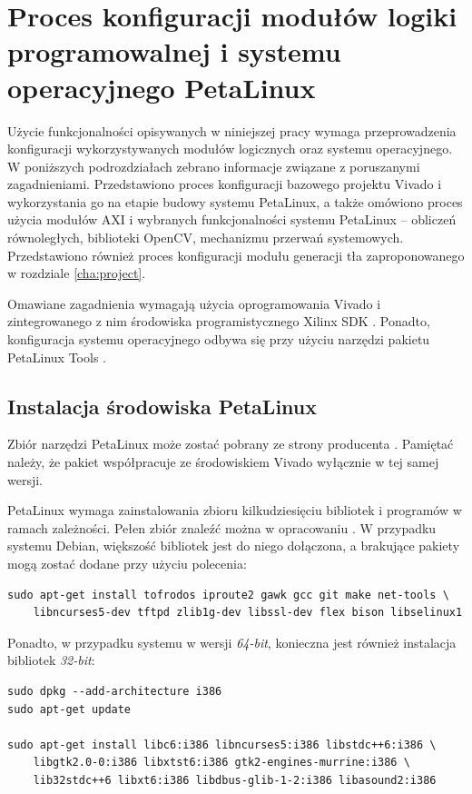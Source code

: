 \chapter{Proces konfiguracji modułów logiki programowalnej i systemu operacyjnego PetaLinux}
\label{cha:vivado-conf}

Użycie funkcjonalności opisywanych w niniejszej pracy wymaga przeprowadzenia konfiguracji wykorzystywanych modułów logicznych oraz systemu operacyjnego. 
W poniższych podrozdziałach zebrano informacje związane z poruszanymi zagadnieniami. 
Przedstawiono proces konfiguracji bazowego projektu Vivado i wykorzystania go na etapie budowy systemu PetaLinux, a także omówiono proces użycia modułów AXI i wybranych funkcjonalności systemu PetaLinux -- obliczeń równoległych, biblioteki OpenCV, mechanizmu przerwań systemowych.
Przedstawiono również proces konfiguracji modułu generacji tła zaproponowanego w rozdziale \ref{cha:project}.

Omawiane zagadnienia wymagają użycia oprogramowania Vivado \cite{vivado-home} i zintegrowanego z nim środowiska programistycznego Xilinx SDK \cite{xsdk-home}. Ponadto, konfiguracja systemu operacyjnego odbywa się przy użyciu narzędzi pakietu PetaLinux Tools \cite{petalinux-tools}.

\section{Instalacja środowiska PetaLinux}

Zbiór narzędzi PetaLinux może zostać pobrany ze strony producenta \cite{petalinux-tools}. Pamiętać należy, że pakiet współpracuje ze środowiskiem Vivado wyłącznie w tej samej wersji.

PetaLinux wymaga zainstalowania zbioru kilkudziesięciu bibliotek i programów w ramach zależności. Pełen zbiór znaleźć można w opracowaniu \cite{petalinux-doc}. W przypadku systemu Debian, większość bibliotek jest do niego dołączona, a brakujące pakiety mogą zostać dodane przy użyciu polecenia:

\begin{lstlisting}[breaklines]
sudo apt-get install tofrodos iproute2 gawk gcc git make net-tools \
	libncurses5-dev tftpd zlib1g-dev libssl-dev flex bison libselinux1
\end{lstlisting}

Ponadto, w przypadku systemu w wersji \emph{64-bit}, konieczna jest również instalacja bibliotek \emph{32-bit}:
\begin{lstlisting}[breaklines]
sudo dpkg --add-architecture i386
sudo apt-get update

sudo apt-get install libc6:i386 libncurses5:i386 libstdc++6:i386 \
	libgtk2.0-0:i386 libxtst6:i386 gtk2-engines-murrine:i386 \
	lib32stdc++6 libxt6:i386 libdbus-glib-1-2:i386 libasound2:i386
\end{lstlisting}

